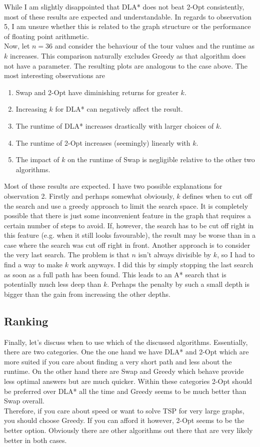 \documentclass{article}
\begin{document}
While I am slightly disappointed that DLA* does not beat 2-Opt consistently,
most of these results are expected and understandable. In regards to observation
5, I am unsure whether this is related to the graph structure or the performance
of floating point arithmetic.\\
Now, let $n=36$ and consider the behaviour of the tour values and
the runtime as $k$ increases. This comparison naturally excludes Greedy as
that algorithm does not have a parameter. The resulting plots are
analogous to the case above. The most interesting observations are
\begin{enumerate}
	\item Swap and 2-Opt have diminishing returns for greater $k$.
	\item Increasing $k$ for DLA* can negatively affect the result.
	\item The runtime of DLA* increases drastically with larger choices of $k$.
	\item The runtime of 2-Opt increases (seemingly) linearly with $k$.
	\item The impact of $k$ on the runtime of Swap is negligible relative
	      to the other two algorithms.
\end{enumerate}
Most of these results are expected. I have two possible explanations
for observation 2. Firstly and perhaps somewhat obviously, $k$ defines
when to cut off the search and use a greedy approach to limit the
search space. It is completely possible that there is just
some inconvenient feature in the graph that requires a certain number of
steps to avoid. If, however, the search has to be cut off right in
this feature (e.g. when it still looks favourable), the result may be
worse than in a case where the search was cut off right in front.
Another approach is to consider the very last search. The problem is that
$n$ isn't always divisible by $k$, so I had to find a way to make $k$
work anyways. I did this by simply stopping the last search as soon
as a full path has been found. This leads to an A* search that
is potentially much less deep than $k$. Perhaps the penalty by such
a small depth is bigger than the gain from increasing the other depths.



\subsection{Ranking}

Finally, let's discuss when to use which of the discussed algorithms.
Essentially, there
are two categories. One the one hand we have DLA* and 2-Opt which are
more suited if you care about finding a very short path and less about
the runtime. On the other hand there are Swap and Greedy which behave
provide less optimal answers but are much quicker. Within these categories
2-Opt should be preferred over DLA* all the time and Greedy seems to be
much better than Swap overall.\\
Therefore, if you care about speed or want to solve TSP for very large
graphs, you should choose Greedy. If you can afford it however, 2-Opt
seems to be the better option. Obviously there are other algorithms
out there that are very likely better in both cases.
\end{document}

